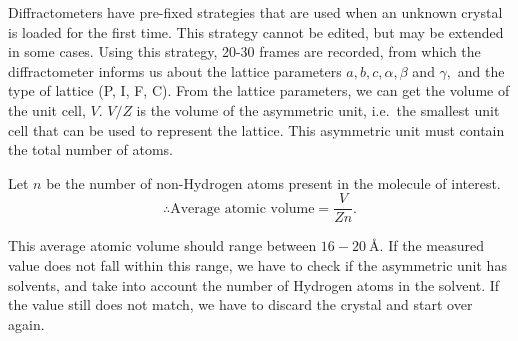 Diffractometers have pre-fixed strategies that are used when an unknown crystal is loaded for the first time. This strategy cannot be edited, but may be extended in some cases. Using this strategy, 20-30 frames are recorded, from which the diffractometer informs us about the lattice parameters $a, b, c, \alpha, \beta$ and $\gamma,$ and the type of lattice (P, I, F, C). From the lattice parameters, we can get the volume of the unit cell, $V.$ $V / Z$ is the volume of the asymmetric unit, i.e.\ the smallest unit cell that can be used to represent the lattice. This asymmetric unit must contain the total number of atoms.

Let $n$ be the number of non-Hydrogen atoms present in the molecule of interest.%
%
\begin{equation}
\therefore \text{Average atomic volume} = \dfrac{V}{Zn}.
\end{equation}

This average atomic volume should range between $16-20~\si{\angstrom}.$ If the measured value does not fall within this range, we have to check if the asymmetric unit has solvents, and take into account the number of Hydrogen atoms in the solvent. If the value still does not match, we have to discard the crystal and start over again.